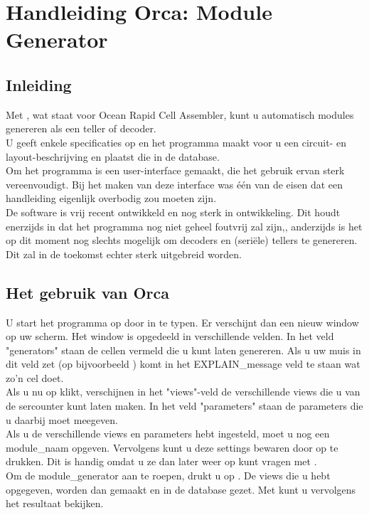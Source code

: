 \section{Handleiding Orca: Module Generator}
\subsection{Inleiding}

Met , wat staat voor Ocean Rapid Cell Assembler, kunt u automatisch modules genereren als een teller of decoder.\\
U geeft enkele specificaties op en het programma maakt voor u een circuit- en layout-beschrijving en plaatst die in de database.\\
Om het programma is een user-interface gemaakt, die het gebruik ervan sterk vereenvoudigt. Bij het maken van deze interface was \'e\'en van de eisen dat een handleiding eigenlijk overbodig zou moeten zijn.\\
De software is vrij recent ontwikkeld en nog sterk in ontwikkeling. Dit houdt enerzijds in dat het programma nog niet geheel foutvrij zal zijn,, anderzijds is het op dit moment nog slechts mogelijk om decoders en (seri\"ele) tellers te genereren. Dit zal in de toekomst echter sterk uitgebreid worden. 

\subsection{Het gebruik van Orca}

U start het programma op door  in te typen. Er verschijnt dan een nieuw window op uw scherm. Het window is opgedeeld in verschillende velden. In het veld "generators" staan de cellen vermeld die u kunt laten genereren. Als u uw muis in dit veld zet (op bijvoorbeeld ) komt in het EXPLAIN\_message veld te staan wat zo'n cel doet.\\
Als u nu op  klikt, verschijnen in het "views"-veld de verschillende views die u van de sercounter kunt laten maken. In het veld "parameters" staan de parameters die u daarbij moet meegeven.\\
Als u de verschillende views en parameters hebt ingesteld, moet u nog een module\_naam opgeven. Vervolgens kunt u deze settings bewaren door op  te drukken. Dit is handig omdat u ze dan later weer op kunt vragen met .\\
Om de module\_generator aan te roepen, drukt u op . De views die u hebt opgegeven, worden dan gemaakt en in de database gezet. Met  kunt u vervolgens het resultaat bekijken.\\

